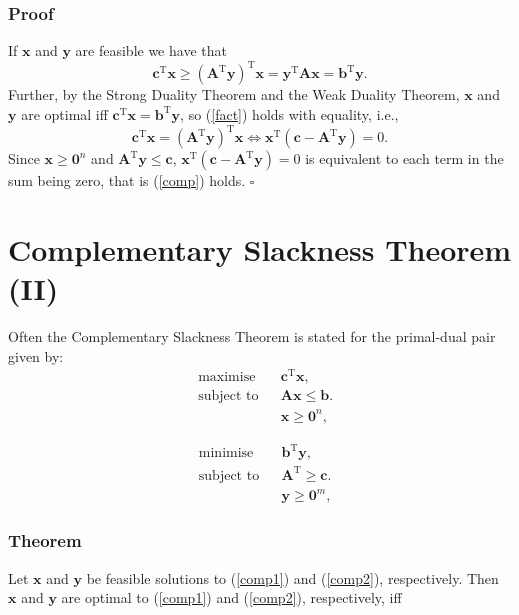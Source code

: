 \documentclass[12pt, a4paper]{article}
\begin{document}
\subsubsection*{Proof}
If $\bm{x}$ and $\bm{y}$ are feasible we have that 
\begin{equation}
\label{fact}
\bm{c}^{\text{T}}\bm{x} \geq (\bm{A}^{\text{T}}\bm{y})^{\text{T}}\bm{x} = \bm{y}^{\text{T}}\bm{Ax} = \bm{b}^{\text{T}}\bm{y}.
\end{equation}
Further, by the Strong Duality Theorem and the Weak Duality Theorem, $\bm{x}$ and $\bm{y}$ are optimal iff $\bm{c}^{\text{T}}\bm{x} = \bm{b}^{\text{T}}\bm{y}$, so (\ref{fact}) holds with equality, i.e.,
\begin{equation*}
\bm{c}^{\text{T}}\bm{x} = (\bm{A}^{\text{T}}\bm{y})^{\text{T}}\bm{x} \Leftrightarrow \bm{x}^{\text{T}}(\bm{c}-\bm{A}^{\text{T}}\bm{y})=0.
\end{equation*}
Since $\bm{x} \geq \bm{0}^n$ and $\bm{A}^{\text{T}}\bm{y} \leq \bm{c}$, $\bm{x}^{\text{T}}(\bm{c}-\bm{A}^{\text{T}}\bm{y})=0$ is equivalent to each term in the sum being zero, that is (\ref{comp}) holds. $\square$

\section{Complementary Slackness Theorem (II)}
Often the Complementary Slackness Theorem is stated for the primal-dual pair given by:
\begin{equation}
\label{comp1}
\begin{aligned}
& {\text{maximise}}
& & \bm{c}^{\text{T}}\bm{x}, \\
& \text{subject to}
& & \bm{Ax}\leq\bm{b}. \\
&&& \bm{x} \geq \bm{0}^n,
\end{aligned}
\end{equation}

\begin{equation}
\label{comp2}
\begin{aligned}
& {\text{minimise}}
& & \bm{b}^{\text{T}}\bm{y}, \\
& \text{subject to}
& & \bm{A}^{\text{T}}\geq\bm{c}. \\
&&& \bm{y} \geq \bm{0}^m,
\end{aligned}
\end{equation}

\subsubsection*{Theorem}
Let $\bm{x}$ and $\bm{y}$ be feasible solutions to (\ref{comp1}) and (\ref{comp2}), respectively. Then $\bm{x}$ and $\bm{y}$ are optimal to (\ref{comp1}) and (\ref{comp2}), respectively, iff
\end{document}
